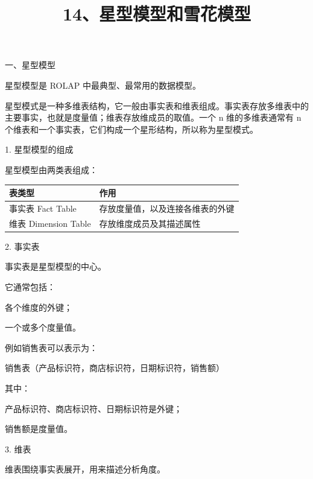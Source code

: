 \documentclass[UTF8,zihao=-4]{ctexart}
\begin{document}
\title{14、星型模型和雪花模型}
\author{}
\date{}
\maketitle

一、星型模型\par

星型模型是 ROLAP 中最典型、最常用的数据模型。\par

星型模式是一种多维表结构，它一般由事实表和维表组成。事实表存放多维表中的主要事实，也就是度量值；维表存放维成员的取值。一个 n 维的多维表通常有 n 个维表和一个事实表，它们构成一个星形结构，所以称为星型模式。\par

1. 星型模型的组成\par

星型模型由两类表组成：\par

\begin{tabularx}{\linewidth}{|*{2}{>{\RaggedRight\arraybackslash}X|}}
\hline
表类型 & 作用 \\
\hline
事实表 Fact Table & 存放度量值，以及连接各维表的外键 \\
\hline
维表 Dimension Table & 存放维度成员及其描述属性 \\
\hline
\end{tabularx}

2. 事实表\par

事实表是星型模型的中心。\par

它通常包括：\par

各个维度的外键；\par
一个或多个度量值。\par

例如销售表可以表示为：\par

销售表（产品标识符，商店标识符，日期标识符，销售额）\par

其中：\par

产品标识符、商店标识符、日期标识符是外键；\par
销售额是度量值。\par

3. 维表\par

维表围绕事实表展开，用来描述分析角度。\par
\end{document}
